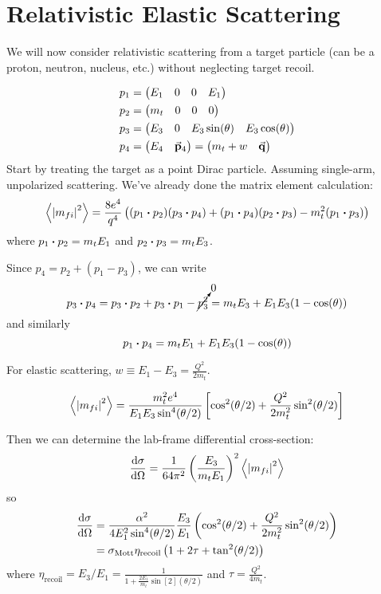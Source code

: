 \documentclass[a4paper,twoside,master.tex]{subfiles}
\begin{document}
\section{Relativistic Elastic Scattering}\label{sec:relativistic_elastic_scattering}

We will now consider relativistic scattering from a target particle (can be a proton, neutron, nucleus, etc.) without neglecting target recoil.

\begin{align}
    p_1 &= \mqty(E_1 & 0 & 0 & E_1) \\
    p_2 &= \mqty(m_t & 0 & 0 & 0) \\
    p_3 &= \mqty(E_3 & 0 & E_3 \sin(\theta) & E_3 \cos(\theta)) \\
    p_4 &= \mqty(E_4 & \va{p}_4) = \mqty(m_t + w & \va{q}) \\
\end{align}
Start by treating the target as a point Dirac particle. Assuming single-arm, unpolarized scattering. We've already done the matrix element calculation:
\begin{equation}
    \ev{\abs{m_{fi}}^2} = \frac{8 e^4}{q^4} \left( (p_1 \vdot p_2)(p_3 \vdot p_4) + (p_1 \vdot p_4)(p_2 \vdot p_3) - m_t^2 (p_1 \vdot p_3) \right)
\end{equation}
where $ p_1 \vdot p_2 = m_t E_1 $ and $ p_2 \vdot p_3 = m_t E_3 $.

Since $ p_4 = p_2 + (p_1 - p_3) $, we can write
\begin{equation}
    p_3 \vdot p_4 = p_3 \vdot p_2 + p_3 \vdot p_1 - \cancelto{0}{p_3^2} = m_t E_3 + E_1 E_3 (1 - \cos(\theta))
\end{equation}
and similarly
\begin{equation}
    p_1 \vdot p_4 = m_t E_1 + E_1 E_3 (1 - \cos(\theta))
\end{equation}

For elastic scattering, $ w \equiv E_1 - E_3 = \frac{Q^2}{2m_t} $.

\begin{equation}
    \ev{\abs{m_{fi}}^2} = \frac{m_t^2 e^4}{E_1 E_3 \sin[4](\theta / 2)} \left[ \cos[2](\theta / 2) + \frac{Q^2}{2m_t^2} \sin[2](\theta / 2) \right]
\end{equation}

Then we can determine the lab-frame differential cross-section:
\begin{equation}
    \dv{\sigma}{\Omega} = \frac{1}{64 \pi^2} \left( \frac{E_3}{m_t E_1} \right)^2 \ev{\abs{m_{fi}}^2}
\end{equation}
so
\begin{align}
    \dv{\sigma}{\Omega} &= \frac{\alpha^2}{4 E_1^2 \sin[4](\theta / 2)} \frac{E_3}{E_1} \left( \cos[2](\theta / 2) + \frac{Q^2}{2 m_t^2} \sin[2](\theta / 2) \right) \\
                        &= \sigma_{\text{Mott}} \eta_{\text{recoil}} \left( 1 + 2 \tau + \tan[2](\theta / 2) \right)
\end{align}
where $ \eta_{\text{recoil}} = E_3 / E_1 = \frac{1}{1 + \frac{2 E_1}{m_t} \sin[2](\theta / 2)} $ and $ \tau = \frac{Q^2}{4 m_t}  $.
\end{document}
